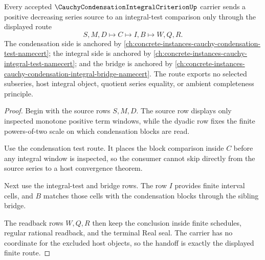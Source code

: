 \begin{theorem}
\label{thm:cauchy-condensation-integral-criterion-handoff}
Every accepted $\CauchyCondensationIntegralCriterionUp$ carrier sends a positive decreasing series source to an integral-test comparison only through the displayed route
$$
S,M,D \longmapsto C \longmapsto I,B \longmapsto W,Q,R.
$$
The condensation side is anchored by \autoref{ch:concrete-instances-cauchy-condensation-test-namecert}; the integral side is anchored by \autoref{ch:concrete-instances-cauchy-integral-test-namecert}; and the bridge is anchored by \autoref{ch:concrete-instances-cauchy-condensation-integral-bridge-namecert}. The route exports no selected subseries, host integral object, quotient series equality, or ambient completeness principle.
\end{theorem}
\begin{proof}
Begin with the source rows $S,M,D$. The source row displays only inspected monotone positive term windows, while the dyadic row fixes the finite powers-of-two scale on which condensation blocks are read.

Use the condensation test route. It places the block comparison inside $C$ before any integral window is inspected, so the consumer cannot skip directly from the source series to a host convergence theorem.

Next use the integral-test and bridge rows. The row $I$ provides finite interval cells, and $B$ matches those cells with the condensation blocks through the sibling bridge.

The readback rows $W,Q,R$ then keep the conclusion inside finite schedules, regular rational readback, and the terminal Real seal. The carrier has no coordinate for the excluded host objects, so the handoff is exactly the displayed finite route.
\end{proof}

